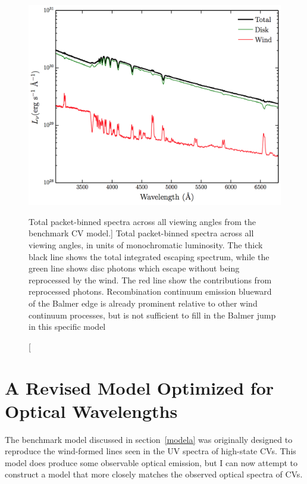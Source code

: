 \begin{figure} 
\centering
\includegraphics[width=1.0\textwidth]{figures/05-cvpaper/modela_escaping.png}
\caption
[Total packet-binned spectra across all viewing angles from the benchmark CV model.]
{Total packet-binned spectra across all viewing angles, in units
of monochromatic luminosity.
The thick black line shows the total 
integrated escaping spectrum, 
while the green line shows disc photons which escape without being reprocessed by
the wind. The red line show the contributions from reprocessed photons. 
Recombination continuum emission blueward of the Balmer 
edge is already prominent relative to other wind continuum processes, but is not sufficient
to fill in the Balmer jump in this specific model}
\label{cont}
\end{figure} 


\newpage



%
%

\section{A Revised Model Optimized for Optical Wavelengths}

The benchmark model discussed in section~\ref{modela} was originally
designed to reproduce the wind-formed lines seen in the UV spectra of
high-state CVs. This model does produce some observable
optical emission, but I can now attempt to construct a model that more closely 
matches the observed optical spectra of CVs. 

